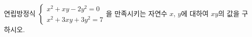 연립방정식 $\begin{cases} x^2+xy-2y^2=0 \\ x^2+3xy+3y^2=7 \end{cases}$을 만족시키는 자연수 $x$, $y$에 대하여 $xy$의 값을 구하시오.
